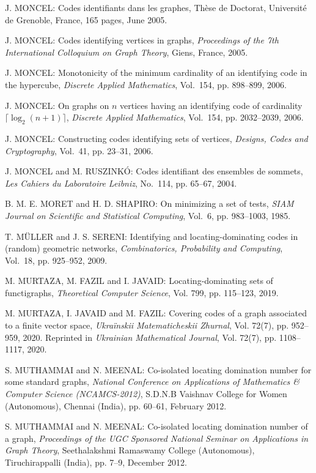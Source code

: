 \begin{thebibliography}{999}
J. MONCEL: Codes identifiants dans les graphes, Th\`ese de
Doctorat, Universit\'e de Grenoble, France, 165 pages, June 2005.

J. MONCEL: Codes identifying vertices in graphs, {\it Proceedings of the 7th International Colloquium on Graph Theory}, Giens, France, 2005.

J. MONCEL: Monotonicity of the minimum cardinality of an identifying code in the hypercube, {\it Discrete Applied Mathematics}, Vol.~154, pp. 898--899, 2006.

J. MONCEL: On graphs on $n$ vertices having an identifying code of cardinality $\lceil \log_2 (n+1)\rceil$, {\it Discrete Applied Mathematics}, Vol.~154, pp. 2032--2039, 2006.

J. MONCEL: Constructing codes identifying sets of vertices, {\it Designs, Codes and Cryptography}, Vol.~41, pp. 23--31, 2006.

J. MONCEL and M. RUSZINK\'O: Codes identifiant des ensembles de sommets, {\it Les Cahiers du Laboratoire Leibniz}, No.~114, pp. 65--67, 2004.

B. M. E. MORET and H. D. SHAPIRO: On minimizing a set of tests, {\it SIAM Journal on Scientific and Statistical Computing}, Vol.~6, pp. 983--1003, 1985.

T. M\"{U}LLER and J. S. SERENI: Identifying and locating-dominating codes in (random) geometric networks, {\it Combinatorics, Probability and Computing}, Vol.~18, pp. 925--952, 2009.

M. MURTAZA, M. FAZIL and I. JAVAID: Locating-dominating sets of functigraphs, {\it Theoretical Computer Science}, Vol. 799, pp. 115--123, 2019.

M. MURTAZA, I. JAVAID and M. FAZIL: Covering codes of a graph associated to a finite vector space, {\it Ukra\"{i}nskii Matematicheskii Zhurnal}, Vol. 72(7), pp. 952--959, 2020. Reprinted in {\it Ukrainian Mathematical Journal}, Vol. 72(7), pp. 1108--1117, 2020.

S. MUTHAMMAI and N. MEENAL: Co-isolated locating domination number for  some  standard  graphs, {\it National Conference on  Applications of Mathematics \& Computer Science (NCAMCS-2012)}, S.D.N.B  Vaishnav College for Women (Autonomous), Chennai (India), pp.  60--61, February 2012.

S. MUTHAMMAI and N. MEENAL: Co-isolated locating domination number of a  graph, {\it Proceedings of the UGC Sponsored National Seminar on  Applications  in  Graph Theory}, Seethalakshmi  Ramaswamy  College (Autonomous), Tiruchirappalli (India), pp. 7--9, December 2012.


\end{thebibliography}
